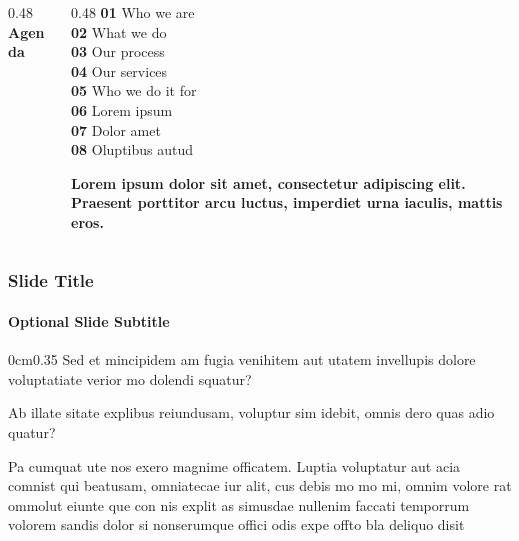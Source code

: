 \documentclass[
	aspectratio=169, %
	t, %
	onlytextwidth, %
	10pt, %
]{beamer}
\begin{document}


\begingroup
	
	\begin{frame}
		\begin{columns}[T] %
			\begin{column}{0.48\linewidth} %
				\HUGE\textbf{Agenda}
			\end{column}
			\begin{column}{0.48\linewidth} %
				\textbf{01} Who we are\\ %
				\textbf{02} What we do\\
				\textbf{03} Our process\\
				\textbf{04} Our services\\
				\textbf{05} Who we do it for\\
				\textbf{06} Lorem ipsum\\
				\textbf{07} Dolor amet\\
				\textbf{08} Oluptibus autud
				
				\textbf{Lorem ipsum dolor sit amet, consectetur adipiscing elit. Praesent porttitor arcu luctus, imperdiet urna iaculis, mattis eros.}
			\end{column}
		\end{columns}
	\end{frame}
\endgroup


\begin{frame}
	\frametitle{Slide Title}
	\framesubtitle{Optional Slide Subtitle}
	
	\begin{adjustwidth}{0cm}{0.35\textwidth} %
		Sed et mincipidem am fugia venihitem aut utatem invellupis dolore voluptatiate verior mo dolendi squatur?

		Ab illate sitate explibus reiundusam, voluptur sim idebit, omnis dero quas adio quatur?

		Pa cumquat ute nos exero magnime officatem. Luptia voluptatur aut acia comnist qui beatusam, omniatecae iur alit, cus debis mo mo mi, omnim volore rat ommolut eiunte que con nis explit as simusdae nullenim faccati temporrum volorem sandis dolor si nonserumque offici odis expe offto bla deliquo disit
	\end{adjustwidth}
\end{frame}
\end{document}
